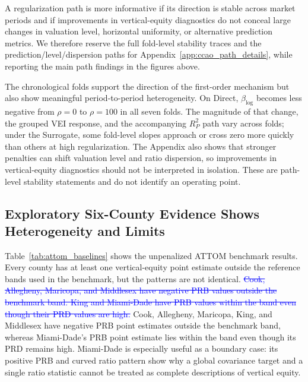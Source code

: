 \documentclass[10pt]{article}
\theoremstyle{definition}
\newcommand{\1}{\mathbf{1}}
\newcommand{\oldtext}[1]{\textcolor{blue}{\sout{#1}}}
\newcommand{\newtext}[1]{\textcolor{impGreen}{#1}}
\begin{document}
A regularization path is more informative if its direction is stable across market
periods and if improvements in vertical-equity diagnostics do not conceal large
changes in valuation level, horizontal uniformity, or alternative prediction
metrics. We therefore reserve the full fold-level stability traces and the
prediction/level/dispersion paths for Appendix~\ref{app:ccao_path_details}, while
reporting the main path findings in the figures above.

The chronological folds support the direction of the first-order mechanism but also
show meaningful period-to-period heterogeneity. On Direct, $\beta_{\log}$ becomes
less negative from $\rho=0$ to $\rho=100$ in all seven folds. The magnitude of
that change, the grouped VEI response, and the accompanying $R^2_P$ path vary
across folds; under the Surrogate, some fold-level slopes approach or cross zero
more quickly than others at high regularization. The Appendix also shows that
stronger penalties can shift valuation level and ratio dispersion, so improvements
in vertical-equity diagnostics should not be interpreted in isolation. These are
path-level stability statements and do not identify an operating point.

\subsection{Exploratory Six-County Evidence Shows Heterogeneity and Limits}
\label{subsec:attom_results}

Table~\ref{tab:attom_baselines} shows the unpenalized ATTOM benchmark results. Every county has at least one vertical-equity point estimate outside the reference bands used in the benchmark, but the patterns are not identical. \oldtext{Cook, Allegheny, Maricopa, and Middlesex have negative PRB values outside the benchmark band. King and Miami-Dade have PRB values within the band even though their PRD values are high.} \newtext{Cook, Allegheny, Maricopa, King, and Middlesex have negative PRB point estimates outside the benchmark band, whereas Miami-Dade's PRB point estimate lies within the band even though its PRD remains high.} Miami-Dade is especially useful as a boundary case: its positive PRB and curved ratio pattern show why a global covariance target and a single ratio statistic cannot be treated as complete descriptions of vertical equity.
\end{document}
